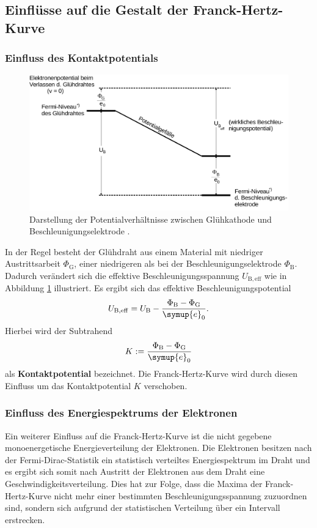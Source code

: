 \subsection{Einflüsse auf die Gestalt der Franck-Hertz-Kurve}
\subsubsection{Einfluss des Kontaktpotentials}
\begin{figure}
  \centering
  \includegraphics[width=\textwidth]{Bilder/fermi_niveau.png}
  \caption{Darstellung der Potentialverhältnisse zwischen Glühkathode und Beschleunigungselektrode \cite{Anleitung}.}
  \label{fig:potentialverh}
\end{figure}
In der Regel besteht der Glühdraht aus einem Material mit niedriger Austrittsarbeit
$\Phi_{\mathrm{G}}$, einer niedrigeren als bei der Beschleunigungselektrode $\Phi_{\mathrm{B}}$.
Dadurch verändert sich die effektive Beschleunigungsspannung $U_{\mathrm{B,eff}}$ wie in
Abbildung \ref{fig:potentialverh} illustriert.
Es ergibt sich das effektive Beschleunigungspotential
\begin{equation}
	U_{\mathrm{B,eff}} = U_{\mathrm{B}} - \frac{\Phi_{\mathrm{B}}-\Phi_{\mathrm{G}}}{\symup{e}_0} \mathrm{.}
\end{equation}
Hierbei wird der Subtrahend
\begin{equation}
	K:=\frac{\Phi_{\mathrm{B}}-\Phi_{\mathrm{G}}}{\symup{e}_0}
\end{equation}
als \textbf{Kontaktpotential} bezeichnet.
Die Franck-Hertz-Kurve wird durch diesen Einfluss um das Kontaktpotential $K$ verschoben.
\subsubsection{Einfluss des Energiespektrums der Elektronen}
Ein weiterer Einfluss auf die Franck-Hertz-Kurve ist die nicht gegebene monoenergetische
Energieverteilung der Elektronen. Die Elektronen besitzen nach der Fermi-Dirac-Statistik ein
statistisch verteiltes Energiespektrum im Draht und es ergibt sich somit nach Austritt der
Elektronen aus dem Draht eine Geschwindigkeitsverteilung. Dies hat zur Folge, dass die Maxima
der Franck-Hertz-Kurve nicht mehr einer bestimmten Beschleunigungsspannung zuzuordnen sind,
sondern sich aufgrund der statistischen Verteilung über ein Intervall erstrecken.
